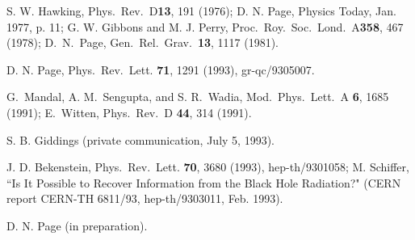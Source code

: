 \documentclass[12pt]{article}
\begin{document}
\begin{thebibliography}{99}
 S. W. Hawking,  Phys.\ Rev.\ D{\bf 13}, 191 (1976);
D. N. Page, Physics Today, Jan. 1977, p. 11;
G. W. Gibbons and M. J. Perry, Proc.\ Roy.\ Soc.\ Lond.\ A{\bf 358},
467
(1978);
D.\ N.\ Page, Gen.\ Rel.\ Grav.\ {\bf 13}, 1117 (1981).

 D. N. Page, Phys.\ Rev.\ Lett. {\bf 71}, 1291
(1993),
gr-qc/9305007.

 G.~Mandal, A. M.~Sengupta, and S. R.~Wadia,
Mod.~Phys.~Lett.~A
{\bf 6}, 1685 (1991); E.~Witten, Phys.~Rev.~D {\bf  44}, 314 (1991).

 S. B. Giddings (private communication, July 5,
1993).

 J. D. Bekenstein, Phys.\ Rev.\ Lett. {\bf 70}, 3680
(1993),
hep-th/9301058;
M. Schiffer, ``Is It Possible to Recover Information
from the Black Hole Radiation?" (CERN report CERN-TH 6811/93,
hep-th/9303011, Feb. 1993).

 D. N. Page (in preparation).

	\end{thebibliography}
\end{document}
